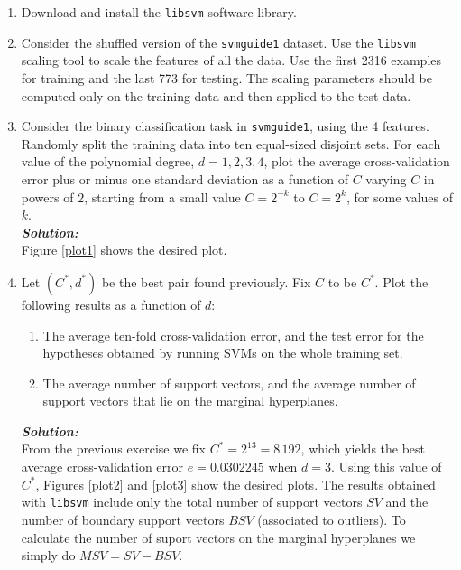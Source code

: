 \documentclass{article}
\begin{document}
\begin{enumerate}
\item Download and install the \texttt{libsvm} software library.
\item Consider the shuffled version of the \texttt{svmguide1} dataset. Use the \texttt{libsvm} scaling tool to scale the features of all the data. Use the first 2316 examples for training and the last 773 for testing. The scaling parameters should be computed only on the training data and then applied to the test data.
\item Consider the binary classification task in \texttt{svmguide1}, using the 4 features. Randomly split the training data into ten equal-sized disjoint sets. For each value of the polynomial degree, $d = 1,2,3,4$, plot the average cross-validation error plus or minus one standard deviation as a function of $C$ varying $C$ in powers of $2$, starting from a small value $C = 2^{-k}$ to $C = 2^k$, for some values of $k$.\\
\textbf{\emph{Solution:}}\\
Figure \ref{plot1} shows the desired plot.

\item Let $(C^*,d^*)$ be the best pair found previously. Fix $C$ to be $C^*$. Plot the following results as a function of $d$:
\begin{enumerate}
\item The average ten-fold cross-validation error, and the test error for the hypotheses obtained by running SVMs on the whole training set.
\item The average number of support vectors, and the average number of support vectors that lie on the marginal hyperplanes.
\end{enumerate}  
\textbf{\emph{Solution:}}\\
From the previous exercise we fix $C^* = 2^{13} = 8\,192$, which yields the best average cross-validation error $e = 0.0302245$ when $d = 3$. Using this value of $C^*$, Figures \ref{plot2} and \ref{plot3} show the desired plots. The results obtained with \texttt{libsvm} include only the total number of support vectors $SV$ and the number of boundary support vectors $BSV$ (associated to outliers). To calculate the number of suport vectors on the marginal hyperplanes we simply do $MSV = SV - BSV$.


\end{enumerate}
\end{document}
